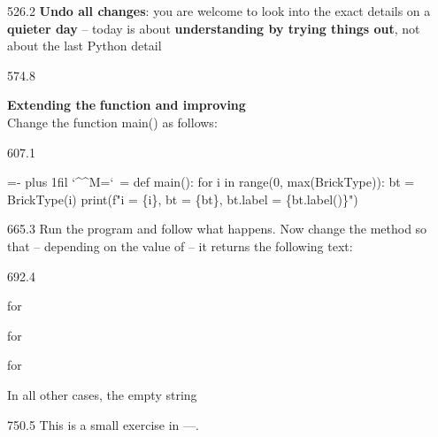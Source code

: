 \documentclass{aslab}
\makeatletter
\newcommand*\kw[1]{\textcolor{codeorange}{#1}}
\newcommand*\fn[1]{\textcolor{codecyan}{#1}}
\newcommand*\num[1]{\textcolor{codered}{#1}}
\newcommand*\str[1]{\textcolor{codestring}{#1}}
\newenvironment{pycode}{\par\ttfamily\hyphenchar\font=-1
  \lineskiplimit=-\maxdimen\lineskip=0pt\parindent=0pt
  \parfillskip=0pt plus 1fil\relax
  \catcode`\^^M=\active\catcode`\ =\active\py@setup\py@gobble}{}
\newcommand*\emo[1]{\makebox[18bp][l]{\emoji{#1}}}
\makeatother
\begin{document}
\begin{region}[x=74.7,right=0,pitch=14.2]{526.2}
\textbf{Undo all changes}: you are welcome to look into the exact details on
a \textbf{quieter day} -- today is about \textbf{understanding by trying
things out}, not about the last Python detail 
\end{region}

\begin{region}[pitch=13.3]{574.8}
\begin{tasks}[start=3]
\item \textbf{Extending the}  \textbf{function and improving}
  \\
  Change the function main() as follows:
\end{tasks}
\end{region}

\begin{region}[x=74.7,pitch=13.2]{607.1}
\begin{pycode}
\kw{def} \fn{main}():
    \kw{for} i \kw{in} \fn{range}(\num{0}, \fn{max}(BrickType)):
        bt = BrickType(i)
        \fn{print}(f\str{"i = \{i\}, bt = \{bt\}, bt.label = \{bt.label()\}"})
\end{pycode}
\end{region}

\begin{region}[x=74.7,right=0,pitch=13.6]{665.3}
Run the program and follow what happens. Now change the method
 so that -- depending on the value of  -- it
returns the following text:
\end{region}

\begin{region}[x=74.7,right=0,pitch=13.5]{692.4}
\begin{bullets}
\item {} for 
\item {} for 
\item {} for 
\item In all other cases, the empty string 
\end{bullets}
\end{region}

\begin{region}[x=74.7,right=0]{750.5}
\emo{1F449}This is a small exercise in ----.
\end{region}
\end{document}
